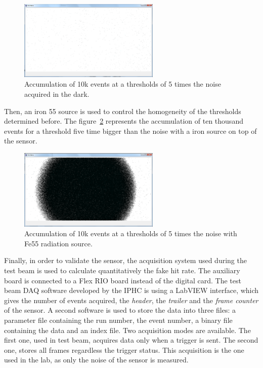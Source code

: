    \begin{figure}[!h]
    \centering
    \includegraphics[width=0.6\textwidth]{Pictures/labTests/dark_10kEvents_not_noisy.png}
    \caption{Accumulation of 10k events at a thresholds of 5 times the noise acquired in the dark.}
    \label{fig:darkEvents}
  \end{figure}

  Then, an iron 55 source is used to control the homogeneity of the thresholds determined before.
  The figure~\ref{fig:fe55} represents the accumulation of ten thousand events for a threshold five time bigger than the noise with a iron source on top of the sensor.
  
  \begin{figure}[!h]
    \centering
    \includegraphics[width=0.6\textwidth]{Pictures/labTests/10kEvents_Fe55_cut5sigma.png}
    \caption{Accumulation of 10k events at a thresholds of 5 times the noise with Fe55 radiation source.}
    \label{fig:fe55}
  \end{figure}

  Finally, in order to validate the sensor, the acquisition system used during the test beam is used to calculate quantitatively the fake hit rate.
  The auxiliary board is connected to a  Flex RIO board instead of the digital card.
  The test beam DAQ software developed by the IPHC is using a LabVIEW interface, which gives the number of events acquired, the \textit{header}, the \textit{trailer} and the \textit{frame counter} of the sensor.
  A second software is used to store the data into three files: a parameter file containing the run number, the event number, a binary file containing the data and an index file.
  Two acquisition modes are available. 
  The first one, used in test beam, acquires data only when a trigger is sent.
  The second one, stores all frames regardless the trigger status. 
  This acquisition is the one used in the lab, as only the noise of the sensor is measured.
   
